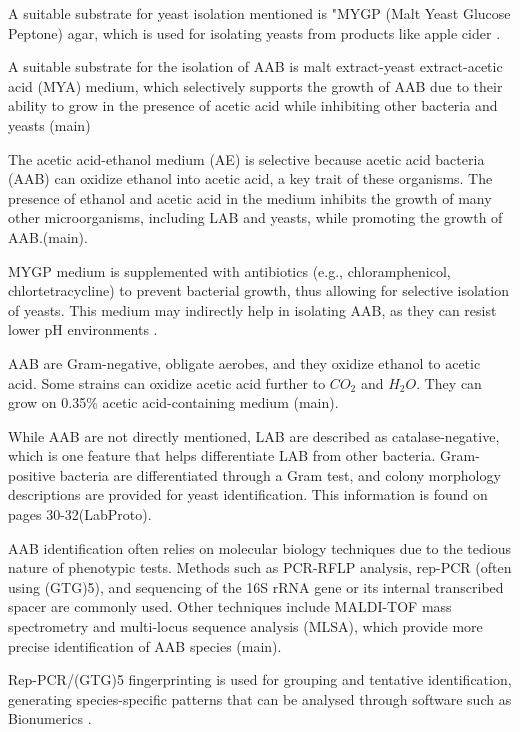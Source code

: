 A suitable substrate for yeast isolation mentioned is "MYGP (Malt Yeast Glucose Peptone) agar, which is used for isolating yeasts from products like apple cider \cite*{LabManual}.

A suitable substrate for the isolation of AAB is malt extract-yeast extract-acetic acid (MYA) medium, which selectively supports the growth of AAB due to their ability to grow in the presence of acetic acid while inhibiting other bacteria and yeasts (main) 

The acetic acid-ethanol medium (AE) is selective because acetic acid bacteria (AAB) can oxidize ethanol into acetic acid, a key trait of these organisms. The presence of ethanol and acetic acid in the medium inhibits the growth of many other microorganisms, including LAB and yeasts, while promoting the growth of AAB.(main).

MYGP medium is supplemented with antibiotics (e.g., chloramphenicol, chlortetracycline) to prevent bacterial growth, thus allowing for selective isolation of yeasts. This medium may indirectly help in isolating AAB, as they can resist lower pH environments \cite*{LabManual}.

AAB are Gram-negative, obligate aerobes, and they oxidize ethanol to acetic acid.
Some strains can oxidize acetic acid further to $CO_2$ and $H_2O$.
They can grow on 0.35\% acetic acid-containing medium (main).

While AAB are not directly mentioned, LAB are described as catalase-negative, which is one feature that helps differentiate LAB from other bacteria. Gram-positive bacteria are differentiated through a Gram test, and colony morphology descriptions are provided for yeast identification. This information is found on pages 30-32(LabProto).

AAB identification often relies on molecular biology techniques due to the tedious nature of phenotypic tests. Methods such as PCR-RFLP analysis, rep-PCR (often using (GTG)5), and sequencing of the 16S rRNA gene or its internal transcribed spacer are commonly used. Other techniques include MALDI-TOF mass spectrometry and multi-locus sequence analysis (MLSA), which provide more precise identification of AAB species (main).

Rep-PCR/(GTG)5 fingerprinting is used for grouping and tentative identification, generating species-specific patterns that can be analysed through software such as Bionumerics \cite*{LabManual}.


